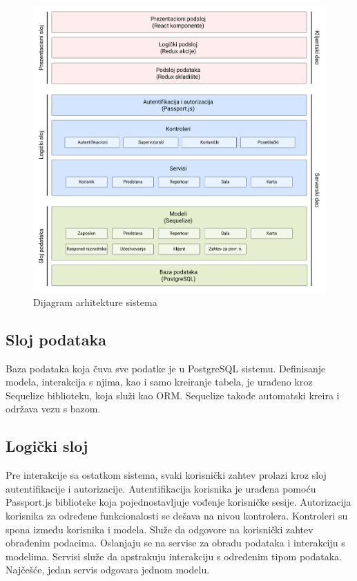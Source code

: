 \documentclass[a4paper]{article}
\begin{document}
\begin{figure}[H]
  \begin{center}
    \includegraphics[width=160mm]{../images/dijagram_arhitekture.png}
  \end{center}
  \caption{Dijagram arhitekture sistema}
  \label{dijagram_arhitehture}
\end{figure}

\subsection{Sloj podataka}
Baza podataka koja čuva sve podatke je u PostgreSQL sistemu. Definisanje modela, interakcija s njima, kao i samo kreiranje tabela, je urađeno kroz Sequelize biblioteku, koja služi kao ORM. Sequelize takođe automatski kreira i održava vezu s bazom. 

\subsection{Logički sloj}
Pre interakcije sa ostatkom sistema, svaki korisnički zahtev prolazi kroz sloj autentifikacije i autorizacije. Autentifikacija korisnika je urađena pomoću Passport.js biblioteke koja pojednostavljuje vođenje korisničke sesije. Autorizacija korisnika za određene funkcionalosti se dešava na nivou kontrolera. 
Kontroleri su spona između korisnika i modela. Služe da odgovore na korisnički zahtev obrađenim podacima. Oslanjaju se na servise za obradu podataka i interakciju s modelima. 
Servisi služe da apstrakuju interakciju s određenim tipom podataka. Najčešće, jedan servis odgovara jednom modelu. 
\end{document}
